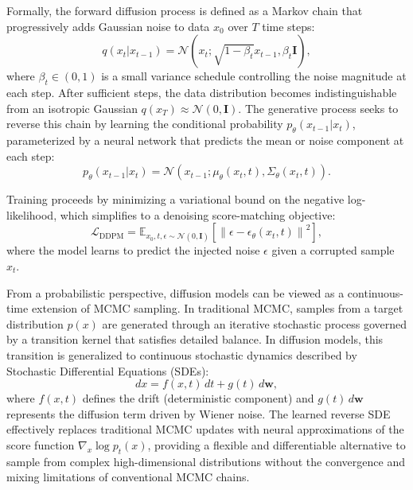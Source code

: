 \vspace{1em}

Formally, the forward diffusion process is defined as a Markov chain that progressively adds Gaussian noise to data \( x_0 \) over \( T \) time steps:
\begin{equation}
    q(x_t | x_{t-1}) = \mathcal{N}\left(x_t; \sqrt{1 - \beta_t} x_{t-1}, \beta_t \mathbf{I}\right),
\end{equation}
where \( \beta_t \in (0, 1) \) is a small variance schedule controlling the noise magnitude at each step. After sufficient steps, the data distribution becomes indistinguishable from an isotropic Gaussian \( q(x_T) \approx \mathcal{N}(0, \mathbf{I}) \). The generative process seeks to reverse this chain by learning the conditional probability \( p_\theta(x_{t-1} | x_t) \), parameterized by a neural network that predicts the mean or noise component at each step:
\begin{equation}
    p_\theta(x_{t-1} | x_t) = \mathcal{N}\left(x_{t-1}; \mu_\theta(x_t, t), \Sigma_\theta(x_t, t)\right).
\end{equation}

Training proceeds by minimizing a variational bound on the negative log-likelihood, which simplifies to a denoising score-matching objective:
\begin{equation}
    \mathcal{L}_{\text{DDPM}} = 
    \mathbb{E}_{x_0, t, \epsilon \sim \mathcal{N}(0, \mathbf{I})}
    \left[ \left\| \epsilon - \epsilon_\theta(x_t, t) \right\|^2 \right],
\end{equation}
where the model learns to predict the injected noise \(\epsilon\) given a corrupted sample \(x_t\).  

\vspace{1em}

From a probabilistic perspective, diffusion models can be viewed as a continuous-time extension of MCMC sampling. In traditional MCMC, samples from a target distribution \(p(x)\) are generated through an iterative stochastic process governed by a transition kernel that satisfies detailed balance. In diffusion models, this transition is generalized to continuous stochastic dynamics described by Stochastic Differential Equations (SDEs):
\begin{equation}
    dx = f(x, t)\,dt + g(t)\,d\mathbf{w},
\end{equation}
where \(f(x, t)\) defines the drift (deterministic component) and \(g(t)\,d\mathbf{w}\) represents the diffusion term driven by Wiener noise. The learned reverse SDE effectively replaces traditional MCMC updates with neural approximations of the score function \(\nabla_x \log p_t(x)\), providing a flexible and differentiable alternative to sample from complex high-dimensional distributions without the convergence and mixing limitations of conventional MCMC chains.  

